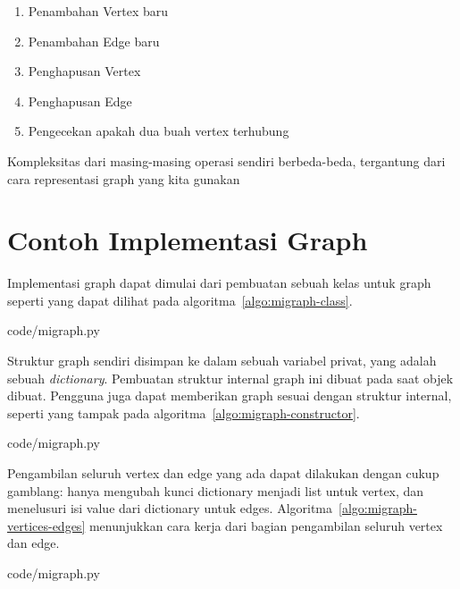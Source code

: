 \begin{enumerate}
    \item Penambahan Vertex baru
    \item Penambahan Edge baru
    \item Penghapusan Vertex
    \item Penghapusan Edge
    \item Pengecekan apakah dua buah vertex terhubung
\end{enumerate}

Kompleksitas dari masing-masing operasi sendiri berbeda-beda, tergantung dari cara representasi graph yang kita gunakan

\section{Contoh Implementasi Graph}

Implementasi graph dapat dimulai dari pembuatan sebuah kelas untuk graph seperti yang dapat dilihat pada algoritma~\ref{algo:migraph-class}.


                {code/migraph.py}

Struktur graph sendiri disimpan ke dalam sebuah variabel privat, yang adalah sebuah \textit{dictionary}. Pembuatan struktur internal graph ini dibuat pada saat objek dibuat. Pengguna juga dapat memberikan graph sesuai dengan struktur internal, seperti yang tampak pada algoritma~\ref{algo:migraph-constructor}.


                {code/migraph.py}

Pengambilan seluruh vertex dan edge yang ada dapat dilakukan dengan cukup gamblang: hanya mengubah kunci dictionary menjadi list untuk vertex, dan menelusuri isi value dari dictionary untuk edges. Algoritma~\ref{algo:migraph-vertices-edges} menunjukkan cara kerja dari bagian pengambilan seluruh vertex dan edge.


                {code/migraph.py}

